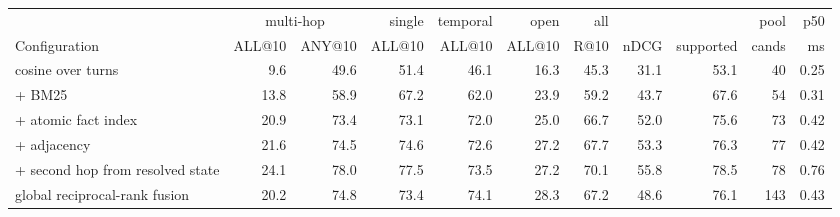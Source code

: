 \begin{tabular}{lrrrrrrrrrr}
\toprule
 & \multicolumn{2}{c}{multi-hop} & single & temporal & open & all & & & pool & p50 \\
\cmidrule(lr){2-3}
Configuration & ALL@10 & ANY@10 & ALL@10 & ALL@10 & ALL@10 & R@10 & nDCG & supported & cands & ms \\
\midrule
cosine over turns & 9.6 & 49.6 & 51.4 & 46.1 & 16.3 & 45.3 & 31.1 & 53.1 & 40 & 0.25 \\
+ BM25 & 13.8 & 58.9 & 67.2 & 62.0 & 23.9 & 59.2 & 43.7 & 67.6 & 54 & 0.31 \\
+ atomic fact index & 20.9 & 73.4 & 73.1 & 72.0 & 25.0 & 66.7 & 52.0 & 75.6 & 73 & 0.42 \\
+ adjacency & 21.6 & 74.5 & 74.6 & 72.6 & 27.2 & 67.7 & 53.3 & 76.3 & 77 & 0.42 \\
+ second hop from resolved state & 24.1 & 78.0 & 77.5 & 73.5 & 27.2 & 70.1 & 55.8 & 78.5 & 78 & 0.76 \\
\midrule
global reciprocal-rank fusion & 20.2 & 74.8 & 73.4 & 74.1 & 28.3 & 67.2 & 48.6 & 76.1 & 143 & 0.43 \\
\bottomrule
\end{tabular}
